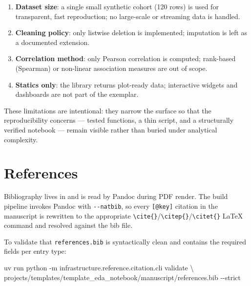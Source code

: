 \documentclass[
  english,
]{article}
\newenvironment{Shaded}{}{}
\newcommand{\AttributeTok}[1]{\textcolor[rgb]{0.49,0.56,0.16}{#1}}
\newcommand{\DataTypeTok}[1]{\textcolor[rgb]{0.56,0.13,0.00}{#1}}
\newcommand{\ExtensionTok}[1]{#1}
\newcommand{\NormalTok}[1]{#1}
\providecommand{\tightlist}{%
  \setlength{\itemsep}{0pt}\setlength{\parskip}{0pt}}
\begin{document}
\begin{enumerate}
\def\labelenumi{\arabic{enumi}.}
\tightlist
\item
  \textbf{Dataset size}: a single small synthetic cohort (120 rows) is
  used for transparent, fast reproduction; no large-scale or streaming
  data is handled.
\item
  \textbf{Cleaning policy}: only listwise deletion is implemented;
  imputation is left as a documented extension.
\item
  \textbf{Correlation method}: only Pearson correlation is computed;
  rank-based (Spearman) or non-linear association measures are out of
  scope.
\item
  \textbf{Statics only}: the library returns plot-ready data;
  interactive widgets and dashboards are not part of the exemplar.
\end{enumerate}

These limitations are intentional: they narrow the surface so that the
reproducibility concerns --- tested functions, a thin script, and a
structurally verified notebook --- remain visible rather than buried
under analytical complexity.

\newpage

\section{References}\label{sec:references}

Bibliography lives in
\href{references.bib}{} and is read by
Pandoc during PDF render. The build pipeline invokes Pandoc with
\texttt{-\/-natbib}, so every \texttt{{[}@key{]}} citation in the
manuscript is rewritten to the appropriate
\texttt{\textbackslash{}cite\{\}}/\texttt{\textbackslash{}citep\{\}}/\texttt{\textbackslash{}citet\{\}}
LaTeX command and resolved against the bib file.

To validate that \texttt{references.bib} is syntactically clean and
contains the required fields per entry type:

\begin{Shaded}
\begin{Highlighting}[]
\ExtensionTok{uv}\NormalTok{ run python }\AttributeTok{{-}m}\NormalTok{ infrastructure.reference.citation.cli validate }\DataTypeTok{\textbackslash{}}
\NormalTok{    projects/templates/template\_eda\_notebook/manuscript/references.bib }\AttributeTok{{-}{-}strict}
\end{Highlighting}
\end{Shaded}




\clearpage


\end{document}
